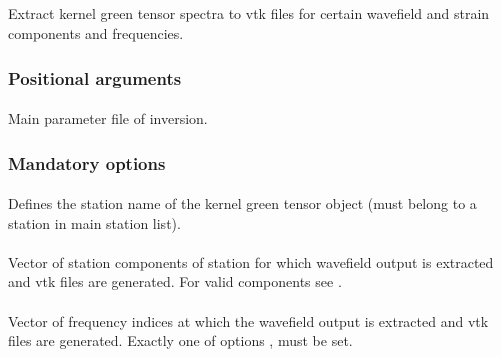 \subsection{} \label{programs_scripts,sec:bin_prog,sec:kgt_2_vtk}
Extract kernel green tensor spectra to vtk files for certain wavefield and strain components and frequencies.
\subsubsection{Positional arguments}
\paragraph{}
Main parameter file of inversion.
\subsubsection{Mandatory options}
\paragraph{ }
Defines the station name of the kernel green tensor object (must belong to a station in main station list).
\paragraph{ }
Vector of  station components of station  for which wavefield output is
extracted and vtk files are generated. 
For valid components see .
\paragraph{}
Vector of  frequency indices at which the wavefield output is extracted and 
vtk files are generated. Exactly one of options  ,  must be set.
